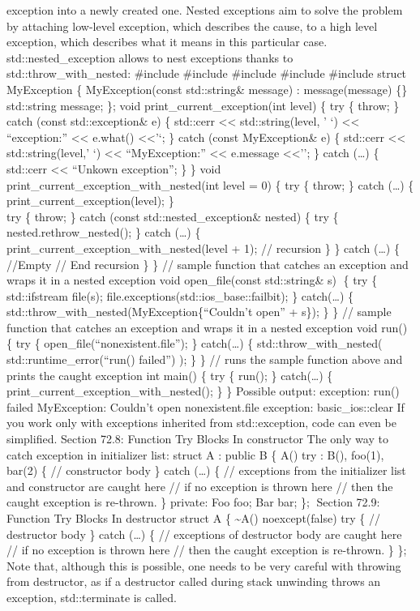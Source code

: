 exception into a newly created one. Nested exceptions aim to solve the
problem by attaching low-level exception, which describes the cause, to
a high level exception, which describes what it means in this particular
case. std::nested\_exception allows to nest exceptions thanks to
std::throw\_with\_nested: \#include \#include \#include \#include
\#include struct MyException \{ MyException(const std::string\& message)
: message(message) \{\} std::string message; \}; void
print\_current\_exception(int level) \{ try \{ throw; \} catch (const
std::exception\& e) \{ std::cerr \textless\textless{} std::string(level,
' `) \textless\textless{} ``exception:'' \textless\textless{} e.what()
\textless\textless{}'\n`; \} catch (const MyException\& e) \{ std::cerr
\textless\textless{} std::string(level,' `) \textless\textless{}
``MyException:'' \textless\textless{} e.message
\textless\textless{}'\n'; \} catch (\ldots) \{ std::cerr
\textless\textless{} ``Unkown exception\n''; \} \} void
print\_current\_exception\_with\_nested(int level = 0) \{ try \{ throw;
\} catch (\ldots) \{ print\_current\_exception(level); \}\\
try \{ throw; \} catch (const std::nested\_exception\& nested) \{ try \{
nested.rethrow\_nested(); \} catch (\ldots) \{
print\_current\_exception\_with\_nested(level + 1); // recursion \} \}
catch (\ldots) \{ //Empty // End recursion \} \} // sample function that
catches an exception and wraps it in a nested exception void
open\_file(const std::string\& s) \{ try \{ std::ifstream file(s);
file.exceptions(std::ios\_base::failbit); \} catch(\ldots) \{
std::throw\_with\_nested(MyException\{``Couldn't open'' + s\}); \} \} //
sample function that catches an exception and wraps it in a nested
exception void run() \{ try \{ open\_file(``nonexistent.file''); \}
catch(\ldots) \{ std::throw\_with\_nested( std::runtime\_error(``run()
failed'') ); \} \} // runs the sample function above and prints the
caught exception int main() \{ try \{ run(); \} catch(\ldots) \{
print\_current\_exception\_with\_nested(); \} \} Possible output:
exception: run() failed MyException: Couldn't open nonexistent.file
exception: basic\_ios::clear If you work only with exceptions inherited
from std::exception, code can even be simpliﬁed. Section 72.8: Function
Try Blocks In constructor The only way to catch exception in initializer
list: struct A : public B \{ A() try : B(), foo(1), bar(2) \{ //
constructor body \} catch (\ldots) \{ // exceptions from the initializer
list and constructor are caught here // if no exception is thrown here
// then the caught exception is re-thrown. \} private: Foo foo; Bar bar;
\}; Section 72.9: Function Try Blocks In destructor struct A \{
\textasciitilde A() noexcept(false) try \{ // destructor body \} catch
(\ldots) \{ // exceptions of destructor body are caught here // if no
exception is thrown here // then the caught exception is re-thrown. \}
\}; Note that, although this is possible, one needs to be very careful
with throwing from destructor, as if a destructor called during stack
unwinding throws an exception, std::terminate is called.
